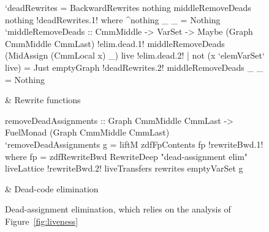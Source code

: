 \documentclass[blockstyle,preprint,natbib,nocopyrightspace]{sigplanconf}
\def\authornote#1{\unskip\relax}
\newcommand{\john}[1]{\authornote{JD: #1}}
\newcommand\figref[1]{Figure~\ref{fig:#1}}
\newcommand\figlabel[1]{\label{fig:#1}}
\begin{document}



\begin{figure*}
\begin{codetable}
\T
\begin{code}
`deadRewrites = BackwardRewrites nothing middleRemoveDeads nothing
!deadRewrites.1!  where ^nothing _ _ = Nothing
        `middleRemoveDeads :: CmmMiddle -> VarSet -> Maybe (Graph CmmMiddle CmmLast)
!elim.dead.1!        middleRemoveDeads (MidAssign (CmmLocal x) _) live
!elim.dead.2!            | not (x `elemVarSet` live) = Just emptyGraph
!deadRewrites.2!        middleRemoveDeads _ _ = Nothing
\end{code}
\B
& Rewrite \mbox{functions}\\
\hline

\T
\begin{code}
removeDeadAssignments :: Graph CmmMiddle CmmLast -> FuelMonad (Graph CmmMiddle CmmLast)
`removeDeadAssignments g = liftM zdfFpContents fp
!rewriteBwd.1!     where fp = zdfRewriteBwd RewriteDeep "dead-assignment elim" liveLattice
!rewriteBwd.2!                  liveTransfers rewrites emptyVarSet g
\end{code}
& \vspace*{12pt}\mbox{Dead-code} elimination\\
\end{codetable}
\caption{Dead-assignment elimination, which relies on the analysis of
\figref{liveness}} 
\figlabel{dead-elim}
\end{figure*}
\end{document}
